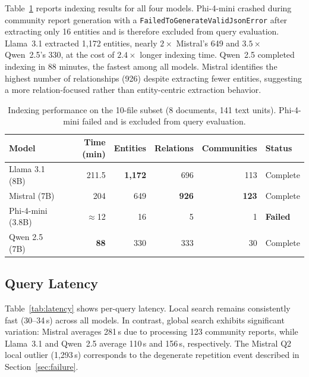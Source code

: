 \documentclass{article}
\begin{document}
Table~\ref{tab:indexing} reports indexing results for all four models. Phi-4-mini crashed during community report generation with a \texttt{FailedToGenerateValidJsonError} after extracting only 16 entities and is therefore excluded from query evaluation. Llama~3.1 extracted 1{,}172 entities, nearly $2\times$ Mistral's 649 and $3.5\times$ Qwen~2.5's 330, at the cost of $2.4\times$ longer indexing time. Qwen~2.5 completed indexing in 88 minutes, the fastest among all models. Mistral identifies the highest number of relationships (926) despite extracting fewer entities, suggesting a more relation-focused rather than entity-centric extraction behavior.

\begin{table}[h]
  \caption{Indexing performance on the 10-file subset (8 documents, 141 text units). Phi-4-mini failed and is excluded from query evaluation.}
  \label{tab:indexing}
  \centering
  \begin{tabular}{lrrrrl}
    \toprule
    Model             & Time (min)      & Entities         & Relations        & Communities      & Status          \\
    \midrule
    Llama 3.1 (8B)    & 211.5           & \textbf{1{,}172} & 696              & 113              & Complete        \\
    Mistral (7B)      & 204             & 649              & \textbf{926}     & \textbf{123}     & Complete        \\
    Phi-4-mini (3.8B) & $\approx$12     & 16               & 5                & 1                & \textbf{Failed} \\
    Qwen 2.5 (7B)     & \textbf{88}     & 330              & 333              & 30               & Complete        \\
    \bottomrule
  \end{tabular}
\end{table}

\subsection{Query Latency}

Table~\ref{tab:latency} shows per-query latency. Local search remains consistently fast (30--34\,s) across all models. In contrast, global search exhibits significant variation: Mistral averages 281\,s due to processing 123 community reports, while Llama~3.1 and Qwen~2.5 average 110\,s and 156\,s, respectively. The Mistral Q2 local outlier (1{,}293\,s) corresponds to the degenerate repetition event described in Section~\ref{sec:failure}.
\end{document}
